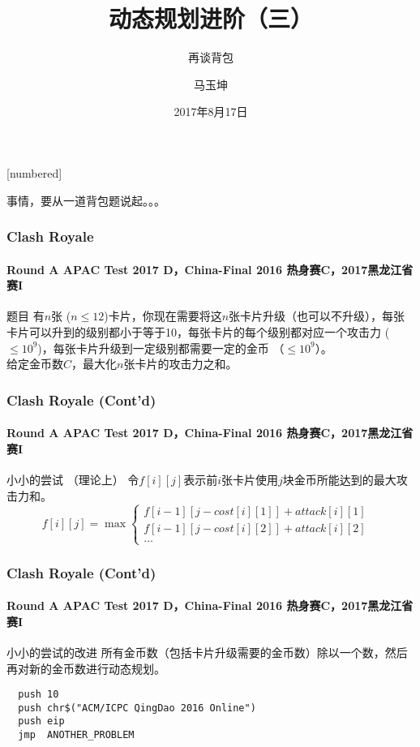 \documentclass[hyperref={unicode=true}]{beamer}
\begin{document}
[numbered]
\renewcommand\figurename{图}
\renewcommand\tablename{表}
\renewcommand\contentsname{\centering 目录}

\title{动态规划进阶（三）}
\subtitle{再谈背包}
\author{马玉坤}
\date{2017年8月17日}

\begin{frame}\titlepage\end{frame}

  \begin{frame}
    事情，要从一道背包题说起。。。
  \end{frame}

  \begin{frame}\frametitle{Clash Royale}
    \framesubtitle{Round A APAC Test 2017 D，China-Final 2016 热身赛C，2017黑龙江省赛I}
    \begin{block}{题目}
      有$n$张 ($n\leq12$)卡片，你现在需要将这$n$张卡片升级（也可以不升级），每张卡片可以升到的级别都小于等于10，每张卡片的每个级别都对应一个攻击力 ($\leq10^9$)，每张卡片升级到一定级别都需要一定的金币 （$\leq10^9$）。\\
      给定金币数$C$，最大化$n$张卡片的攻击力之和。
    \end{block}
  \end{frame}
  \begin{frame}\frametitle{Clash Royale (Cont'd)}
    \framesubtitle{Round A APAC Test 2017 D，China-Final 2016 热身赛C，2017黑龙江省赛I}
    \begin{alertblock}{小小的尝试 （理论上）}
      令$f[i][j]$表示前$i$张卡片使用$j$块金币所能达到的最大攻击力和。\\
      \[f[i][j] = \max\begin{cases}
f[i-1][j-cost[i][1]]+attack[i][1] &\\
f[i-1][j-cost[i][2]]+attack[i][2] &\\
\ldots &
      \end{cases}\]
    \end{alertblock}
  \end{frame}
  \begin{frame}[fragile]\frametitle{Clash Royale (Cont'd)}
    \framesubtitle{Round A APAC Test 2017 D，China-Final 2016 热身赛C，2017黑龙江省赛I}
    \begin{alertblock}{小小的尝试的改进}
      所有金币数（包括卡片升级需要的金币数）除以一个数，然后再对新的金币数进行动态规划。\\
      \begin{verbatim}
  push 10
  push chr$("ACM/ICPC QingDao 2016 Online")
  push eip
  jmp  ANOTHER_PROBLEM
      \end{verbatim}
    \end{alertblock}
  \end{frame}
\end{document}

